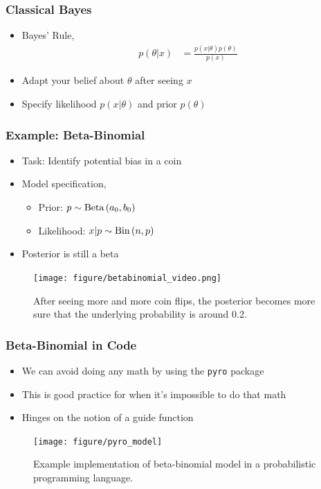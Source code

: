 \documentclass[10pt,mathserif]{beamer}
\begin{document}
\begin{frame}
  \frametitle{Classical Bayes}
  \begin{itemize}
  \item Bayes' Rule,
    \begin{align*}
      p\left(\theta \vert x\right) &= \frac{p\left(x \vert \theta\right)p\left(\theta\right)}{p\left(x\right)}
    \end{align*}
  \item Adapt your belief about $\theta$ after seeing $x$
  \item Specify likelihood $p\left(x \vert \theta\right)$ and prior $p\left(\theta\right)$
  \end{itemize}
\end{frame}

\begin{frame}
  \frametitle{Example: Beta-Binomial}
  \begin{itemize}
  \item Task: Identify potential bias in a coin
  \item Model specification,
    \begin{itemize}
    \item Prior: $p \sim \textnormal{Beta}\left(a_0, b_0\right)$
    \item Likelihood: $x \vert p \sim \textnormal{Bin}\left(n, p\right)$
    \end{itemize}
  \item Posterior is still a beta
  \end{itemize}
\begin{figure}[ht]
  \centering
  \texttt{[image: figure/betabinomial\_video.png]}
  \caption{After seeing more and more coin flips, the posterior becomes more
    sure that the underlying probability is around 0.2. \label{fig:betabinomial}
  }
\end{figure}
\end{frame}

\begin{frame}
  \frametitle{Beta-Binomial in Code}
  \begin{itemize}
  \item We can avoid doing any math by using the \texttt{pyro} package
  \item This is good practice for when it's impossible to do that math
  \item Hinges on the notion of a guide function
  \end{itemize}
  \begin{figure}[ht]
    \centering
    \texttt{[image: figure/pyro\_model]}
    \caption{Example implementation of beta-binomial model in a probabilistic
      programming language. \label{fig:pyro_model} }
  \end{figure}
\end{frame}
\end{document}
